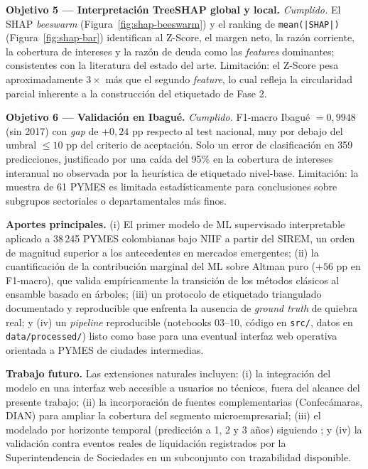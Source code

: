 \documentclass[12pt, letterpaper]{article}
\newcommand{\zaltscore}{Z\textquotesingle\textquotesingle-Score}
\begin{document}
\textbf{Objetivo 5 --- Interpretaci\'on TreeSHAP global y local.} \emph{Cumplido.} El SHAP \textit{beeswarm} (Figura~\ref{fig:shap-beeswarm}) y el ranking de \texttt{mean(|SHAP|)} (Figura~\ref{fig:shap-bar}) identifican al \zaltscore{}, el margen neto, la raz\'on corriente, la cobertura de intereses y la raz\'on de deuda como las \textit{features} dominantes; consistentes con la literatura del estado del arte. Limitaci\'on: el \zaltscore{} pesa aproximadamente $3\times$ m\'as que el segundo \textit{feature}, lo cual refleja la circularidad parcial inherente a la construcci\'on del etiquetado de Fase 2.

\textbf{Objetivo 6 --- Validaci\'on en Ibagu\'e.} \emph{Cumplido.} F1-macro Ibagu\'e $= 0{,}9948$ (sin 2017) con \textit{gap} de $+0{,}24$ pp respecto al test nacional, muy por debajo del umbral $\leq 10$ pp del criterio de aceptaci\'on. Solo un error de clasificaci\'on en 359 predicciones, justificado por una ca\'ida del 95\% en la cobertura de intereses interanual no observada por la heur\'istica de etiquetado nivel-base. Limitaci\'on: la muestra de 61 PYMES es limitada estad\'isticamente para conclusiones sobre subgrupos sectoriales o departamentales m\'as finos.

\textbf{Aportes principales.} (i) El primer modelo de ML supervisado interpretable aplicado a 38\,245 PYMES colombianas bajo NIIF a partir del SIREM, un orden de magnitud superior a los antecedentes en mercados emergentes; (ii) la cuantificaci\'on de la contribuci\'on marginal del ML sobre Altman puro ($+56$ pp en F1-macro), que valida emp\'iricamente la transici\'on de los m\'etodos cl\'asicos al ensamble basado en \'arboles; (iii) un protocolo de etiquetado triangulado documentado y reproducible que enfrenta la ausencia de \textit{ground truth} de quiebra real; y (iv) un \textit{pipeline} reproducible (notebooks 03--10, c\'odigo en \texttt{src/}, datos en \texttt{data/processed/}) listo como base para una eventual interfaz web operativa orientada a PYMES de ciudades intermedias.

\textbf{Trabajo futuro.} Las extensiones naturales incluyen: (i) la integraci\'on del modelo en una interfaz web accesible a usuarios no t\'ecnicos, fuera del alcance del presente trabajo; (ii) la incorporaci\'on de fuentes complementarias (Confec\'amaras, DIAN) para ampliar la cobertura del segmento microempresarial; (iii) el modelado por horizonte temporal (predicci\'on a 1, 2 y 3 a\~nos) siguiendo \citet{Bortolotti2024}; y (iv) la validaci\'on contra eventos reales de liquidaci\'on registrados por la Superintendencia de Sociedades en un subconjunto con trazabilidad disponible.


\end{document}
